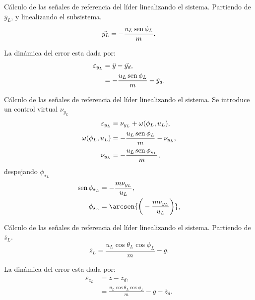 \documentclass[hyperref={pdfpagelabels=false}]{beamer}
\begin{document}
\begin{frame}{Cálculo de las señales de referencia del l\'ider linealizando el sistema.} 
	Partiendo de $\ddot{y_L}$, y linealizando el subsistema.
	\begin{equation}
		\ddot{y_L} = -\frac{u_L \operatorname{sen}{\phi_L}}{m}.
	\end{equation}
	
	La dinámica del error esta dada por: 
	\begin{equation}
		\begin{split}
			\varepsilon_{y_L} &= \ddot{y} - \ddot{y_d},\\
			&=-\frac{u_L \operatorname{sen}{\phi_L}}{m} - \ddot{y_d}.
		\end{split}	
	\end{equation}
\end{frame}


\begin{frame}{Cálculo de las señales de referencia del l\'ider linealizando el sistema.} 
	Se introduce un control virtual $\nu_{y_L}$
	\begin{equation}
		\begin{split}
			\varepsilon_{y_L} &= \nu_{y_L} + \omega(\phi_L,u_L),\\
			\omega(\phi_L,u_L) &= -\frac{u_L \operatorname{sen}{\phi_L}}{m} - \nu_{y_L},\\
			\nu_{y_L} &= -\frac{u_L \operatorname{sen}{\phi_{\star_L}}}{m},
		\end{split}
	\end{equation}
	despejando $\phi_{\star_L}$
	\begin{equation}
		\begin{split}
			\sen{\phi_{\star_L}} &= -\frac{m \nu_{y_L}}{u_L},\\
			\phi_{\star_L} &= \arcsen{\bigg(-\frac{m \nu_{y_L}}{u_L}\bigg)},\\
		\end{split}
	\end{equation}
\end{frame}

\begin{frame}{Cálculo de las señales de referencia del l\'ider linealizando el sistema.} 
	Partiendo de $\ddot{z_L}$.
	\begin{equation}
		\ddot{z_L} = \frac{u_L \cos{\theta_L}\cos{\phi_L}}{m}-g.
	\end{equation}
	
	La dinámica del error esta dada por: 
	\begin{equation}
		\begin{split}
			\varepsilon_{z_L} &= \ddot{z} - \ddot{z_d},\\
			&=  \frac{u_L \cos{\theta_L}\cos{\phi_L}}{m}-g - \ddot{z_d}.
		\end{split}	
	\end{equation}
\end{frame}
\end{document}

